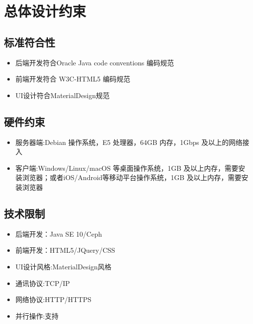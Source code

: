 \chapter{总体设计约束}
 
\section{标准符合性}
\begin{itemize}
  \item 后端开发符合Oracle Java code conventions 编码规范
  \item 前端开发符合 W3C-HTML5 编码规范
  \item UI设计符合MaterialDesign规范
\end{itemize}

\section{硬件约束}
\begin{itemize}
  \item 服务器端:Debian 操作系统，E5 处理器，64GB 内存，1Gbps 及以上的网络接入 
  \item 客户端:Windows/Linux/macOS 等桌面操作系统，1GB 及以上内存，需要安装浏览器；或者iOS/Android等移动平台操作系统，1GB 及以上内存，需要安装浏览器
\end{itemize}

\section{技术限制}
\begin{itemize}
  \item 后端开发：Java SE 10/Ceph
  \item 前端开发：HTML5/JQuery/CSS
  \item UI设计风格:MaterialDesign风格
  \item 通讯协议:TCP/IP
  \item 网络协议:HTTP/HTTPS
  \item 并行操作:支持
\end{itemize}